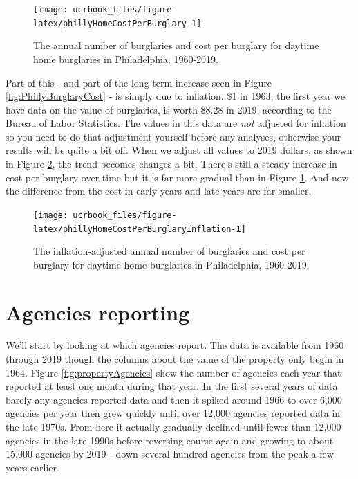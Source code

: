 \documentclass[
  12pt,
  openany]{book}
\begin{document}
\begin{figure}

{\centering \texttt{[image: ucrbook\_files/figure-latex/phillyHomeCostPerBurglary-1]} 

}

\caption{The annual number of burglaries and cost per burglary for daytime home burglaries in Philadelphia, 1960-2019.}\label{fig:phillyHomeCostPerBurglary}
\end{figure}

Part of this - and part of the long-term increase seen in Figure \ref{fig:PhillyBurglaryCost} - is simply due to inflation. \$1 in 1963, the first year we have data on the value of burglaries, is worth \$8.28 in 2019, according to the Bureau of Labor Statistics. The values in this data are \emph{not} adjusted for inflation so you need to do that adjustment yourself before any analyses, otherwise your results will be quite a bit off. When we adjust all values to 2019 dollars, as shown in Figure \ref{fig:phillyHomeCostPerBurglaryInflation}, the trend becomes changes a bit. There's still a steady increase in cost per burglary over time but it is far more gradual than in Figure \ref{fig:phillyHomeCostPerBurglary}. And now the difference from the cost in early years and late years are far smaller.

\begin{figure}

{\centering \texttt{[image: ucrbook\_files/figure-latex/phillyHomeCostPerBurglaryInflation-1]} 

}

\caption{The inflation-adjusted annual number of burglaries and cost per burglary for daytime home burglaries in Philadelphia, 1960-2019.}\label{fig:phillyHomeCostPerBurglaryInflation}
\end{figure}

\hypertarget{agencies-reporting-1}{%
\section{Agencies reporting}\label{agencies-reporting-1}}

We'll start by looking at which agencies report. The data is available from 1960 through 2019 though the columns about the value of the property only begin in 1964. Figure \ref{fig:propertyAgencies} show the number of agencies each year that reported at least one month during that year. In the first several years of data barely any agencies reported data and then it spiked around 1966 to over 6,000 agencies per year then grew quickly until over 12,000 agencies reported data in the late 1970s. From here it actually gradually declined until fewer than 12,000 agencies in the late 1990s before reversing course again and growing to about 15,000 agencies by 2019 - down several hundred agencies from the peak a few years earlier.
\end{document}
